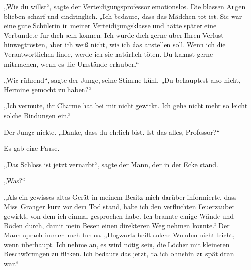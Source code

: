 „Wie du willst“, sagte der Verteidigungsprofessor emotionslos.
Die blassen Augen blieben scharf und eindringlich.
„Ich bedaure, dass das Mädchen tot ist. Sie war eine gute Schülerin in meiner Verteidigungsklasse und hätte später eine Verbündete für dich sein können. Ich würde dich gerne über Ihren Verlust hinwegtrösten, aber ich weiß nicht, wie ich das anstellen soll. Wenn ich die Verantwortlichen finde, werde ich sie natürlich töten. Du kannst gerne mitmachen, wenn es die Umstände erlauben.“

„Wie rührend“, sagte der Junge, seine Stimme kühl.
„Du behauptest also nicht, Hermine gemocht zu haben?“

„Ich vermute, ihr Charme hat bei mir nicht gewirkt. Ich gehe nicht mehr so leicht solche Bindungen ein.“

Der Junge nickte.
„Danke, dass du ehrlich bist. Ist das alles, Professor?“

Es gab eine Pause.

„Das Schloss ist jetzt vernarbt“, sagte der Mann, der in der Ecke stand.

„Was?“

„Als ein gewisses altes Gerät in meinem Besitz mich darüber informierte, dass Miss~Granger kurz vor dem Tod stand, habe ich den verfluchten Feuerzauber gewirkt, von dem ich einmal gesprochen habe. Ich brannte einige Wände und Böden durch, damit mein Besen einen direkteren Weg nehmen konnte.“
Der Mann sprach immer noch tonlos.
„Hogwarts heilt solche Wunden nicht leicht, wenn überhaupt. Ich nehme an, es wird nötig sein, die Löcher mit kleineren Beschwörungen zu flicken. Ich bedaure das jetzt, da ich ohnehin zu spät dran war.“

